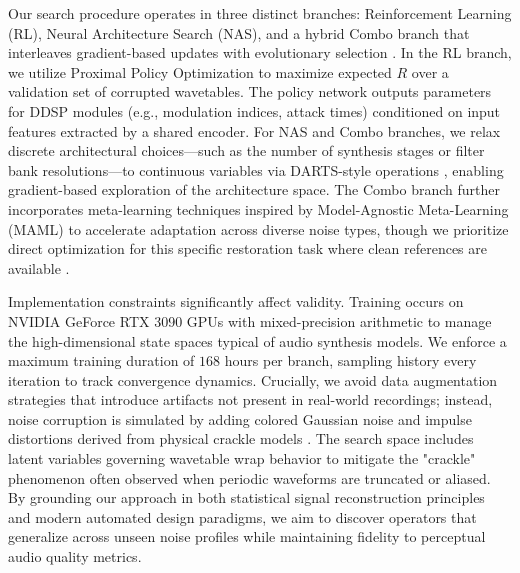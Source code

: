 Our search procedure operates in three distinct branches: Reinforcement Learning (RL), Neural Architecture Search (NAS), and a hybrid Combo branch that interleaves gradient-based updates with evolutionary selection \citep{elsken2019nas}. In the RL branch, we utilize Proximal Policy Optimization to maximize expected $R$ over a validation set of corrupted wavetables. The policy network outputs parameters for DDSP modules (e.g., modulation indices, attack times) conditioned on input features extracted by a shared encoder. For NAS and Combo branches, we relax discrete architectural choices—such as the number of synthesis stages or filter bank resolutions—to continuous variables via DARTS-style operations \citep{liu2019darts}, enabling gradient-based exploration of the architecture space. The Combo branch further incorporates meta-learning techniques inspired by Model-Agnostic Meta-Learning (MAML) to accelerate adaptation across diverse noise types, though we prioritize direct optimization for this specific restoration task where clean references are available \citep{finn2017maml}.

Implementation constraints significantly affect validity. Training occurs on NVIDIA GeForce RTX 3090 GPUs with mixed-precision arithmetic to manage the high-dimensional state spaces typical of audio synthesis models. We enforce a maximum training duration of $168$ hours per branch, sampling history every iteration to track convergence dynamics. Crucially, we avoid data augmentation strategies that introduce artifacts not present in real-world recordings; instead, noise corruption is simulated by adding colored Gaussian noise and impulse distortions derived from physical crackle models \citep{lehtinen2018n2n}. The search space includes latent variables governing wavetable wrap behavior to mitigate the "crackle" phenomenon often observed when periodic waveforms are truncated or aliased. By grounding our approach in both statistical signal reconstruction principles and modern automated design paradigms, we aim to discover operators that generalize across unseen noise profiles while maintaining fidelity to perceptual audio quality metrics.
